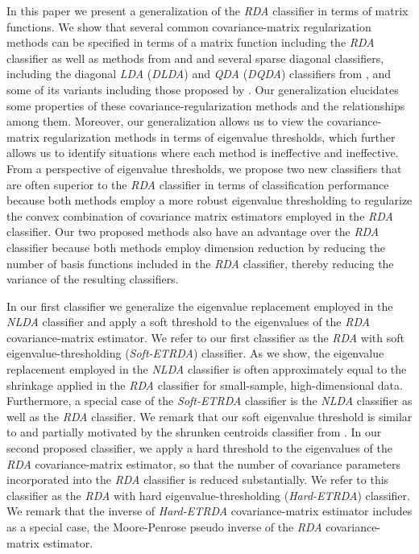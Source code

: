 \documentclass[11pt]{article}
\begin{document}
In this paper we present a generalization of the \emph{RDA} classifier in terms of matrix functions. We show that several common covariance-matrix regularization methods can be specified in terms of a matrix function including the \emph{RDA} classifier as well as methods from \cite{Srivastava:2007ww} and \cite*{Thomaz:2006ef} and several sparse diagonal classifiers, including the diagonal \emph{LDA} (\emph{DLDA}) and \emph{QDA} (\emph{DQDA}) classifiers from \cite{Dudoit:2002ev}, and some of its variants including those proposed by \cite{Pang:2009ik}.  Our generalization elucidates some properties of these covariance-regularization methods and the relationships among them. Moreover, our generalization allows us to view the covariance-matrix regularization methods in terms of eigenvalue thresholds, which further allows us to identify situations where each method is ineffective and ineffective. From a perspective of eigenvalue thresholds, we propose two new classifiers that are often superior to the \emph{RDA} classifier in terms of classification performance because both methods employ a more robust eigenvalue thresholding to regularize the convex combination of covariance matrix estimators employed in the \emph{RDA} classifier. Our two proposed methods also have an advantage over the \emph{RDA} classifier because both methods employ dimension reduction by reducing the number of basis functions included in the \emph{RDA} classifier, thereby reducing the variance of the resulting classifiers.

In our first classifier we generalize the eigenvalue replacement employed in the \emph{NLDA} classifier and apply a soft threshold to the eigenvalues of the \emph{RDA} covariance-matrix estimator. We refer to our first classifier as the \emph{RDA} with soft eigenvalue-thresholding (\emph{Soft-ETRDA}) classifier.  As we show, the eigenvalue replacement employed in the \emph{NLDA} classifier is often approximately equal to the shrinkage applied in the \emph{RDA} classifier for small-sample, high-dimensional data. Furthermore, a special case of the \emph{Soft-ETRDA} classifier is the \emph{NLDA} classifier as well as the \emph{RDA} classifier.  We remark that our soft eigenvalue threshold is similar to and partially motivated by the shrunken centroids classifier from \cite*{Tibshirani:2002ht}. 	In our second proposed classifier, we apply a hard threshold to the eigenvalues of the \emph{RDA} covariance-matrix estimator, so that the number of covariance parameters incorporated into the \emph{RDA} classifier is reduced substantially. We refer to this classifier as the \emph{RDA} with hard eigenvalue-thresholding (\emph{Hard-ETRDA}) classifier. We remark that the inverse of \emph{Hard-ETRDA} covariance-matrix estimator includes as a special case, the Moore-Penrose pseudo inverse of the \emph{RDA} covariance-matrix estimator.
\end{document}
